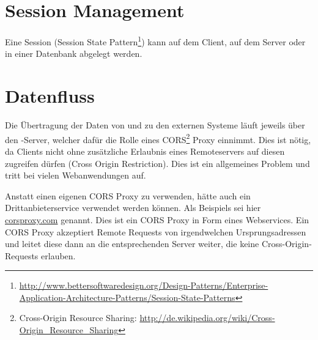 \section{Session Management}
	Eine Session (Session State Pattern\footnote{\url{http://www.bettersoftwaredesign.org/Design-Patterns/Enterprise-Application-Architecture-Patterns/Session-State-Patterns}}) kann auf dem Client, auf dem Server oder in einer Datenbank abgelegt werden.
	
		
	\section{Datenfluss}			
		Die Übertragung der Daten von und zu den externen Systeme läuft jeweils über den \eeppi-Server, welcher dafür die Rolle eines CORS\footnote{Cross-Origin Resource Sharing: \url{http://de.wikipedia.org/wiki/Cross-Origin_Resource_Sharing}} Proxy einnimmt. 
		Dies ist nötig, da Clients nicht ohne zusätzliche Erlaubnis eines Remoteservers
		auf diesen zugreifen dürfen (Cross Origin Restriction).
		Dies ist ein allgemeines Problem und tritt bei vielen Webanwendungen auf.
		
		Anstatt einen eigenen CORS Proxy zu verwenden, hätte auch ein Drittanbieterservice verwendet werden können.
		Als Beispiels sei hier \hyperlink{http://www.corsproxy.com/}{corsproxy.com} genannt.
		Dies ist ein CORS Proxy in Form eines Webservices.
		Ein CORS Proxy akzeptiert Remote Requests von irgendwelchen Ursprungsadressen und leitet diese dann
		an die entsprechenden Server weiter, die keine Cross-Origin-Requests erlauben.
		
